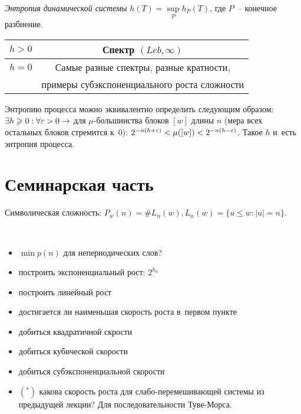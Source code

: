 \documentclass{article}
\begin{document}
\begin{definition}
	\emph{Энтропия динамической системы} $h(T) = \sup\limits_P h_P(T)$, где $P$~--
	конечное разбиение.
\end{definition}

\begin{center}
	\begin{tabular}{|c|c|}
		\hline
		$h > 0$ & Спектр $(Leb, \infty)$\\
		\hline
		$h = 0$ & Самые разные спектры, разные кратности,\\
		        & примеры субэкспоненциального роста сложности\\
		\hline
	\end{tabular}
\end{center}

\begin{theorem}
	Энтропию процесса можно эквивалентно определить следующим образом:
	$\exists h \geqslant 0: \forall \varepsilon > 0 \rightarrow $ для $\mu$-большинства блоков
	$[w]$ длины $n$ (мера всех остальных блоков стремится к~0): $2^{-n(h+\varepsilon)} <
	\mu([w]) < 2^{-n(h-\varepsilon)}$. Такое $h$ и~есть энтропия процесса.
\end{theorem}

\section{Семинарская часть}

Символическая сложность: $P_w(n) = \#L_n(w), L_n(w) = \{u \le w: |u| = n\}$.

\begin{exercise}~\\
	\begin{itemize}
		\item $\min p(n)$ для непериодических слов?
		\item построить экспоненциальный рост: $2^{h_n}$
		\item построить линейный рост
		\item достигается ли наименьшая скорость роста в~первом пункте
		\item добиться квадратичной скрости
		\item добиться кубической скорости
		\item добиться субэкспоненциальной скорости
		\item$(^\ast)$ какова скорость роста для слабо-перемешивающей системы из
			предыдущей лекции? Для последовательности Туве-Морса.
	\end{itemize}
\end{exercise}
\end{document}
